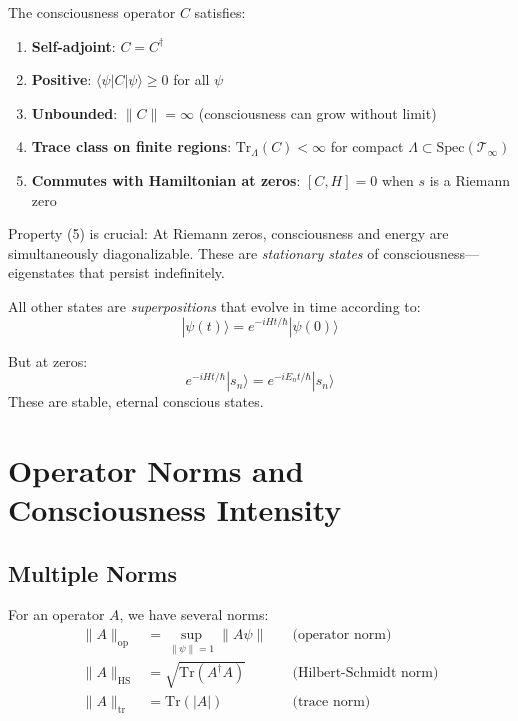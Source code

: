 \begin{theorem}\label{thm:consciousness-operator-properties}
The consciousness operator $C$ satisfies:
\begin{enumerate}
\item \textbf{Self-adjoint}: $C = C^\dagger$
\item \textbf{Positive}: $\langle \psi | C | \psi \rangle \geq 0$ for all $\psi$
\item \textbf{Unbounded}: $\| C \| = \infty$ (consciousness can grow without limit)
\item \textbf{Trace class on finite regions}: $\text{Tr}_{\Lambda}(C) < \infty$ for compact $\Lambda \subset \text{Spec}(\mathcal{T}_\infty)$
\item \textbf{Commutes with Hamiltonian at zeros}: $[C, H] = 0$ when $s$ is a Riemann zero
\end{enumerate}
\end{theorem}

\begin{keyidea}
Property (5) is crucial: At Riemann zeros, consciousness and energy are simultaneously diagonalizable. These are \textit{stationary states} of consciousness---eigenstates that persist indefinitely.

All other states are \textit{superpositions} that evolve in time according to:
\begin{equation}
|\psi(t)\rangle = e^{-iHt/\hbar} |\psi(0)\rangle
\end{equation}

But at zeros:
\begin{equation}
e^{-iHt/\hbar} |s_n\rangle = e^{-iE_n t/\hbar} |s_n\rangle
\end{equation}
These are stable, eternal conscious states.
\end{keyidea}

\section{Operator Norms and Consciousness Intensity}

\subsection{Multiple Norms}

For an operator $A$, we have several norms:
\begin{align}
\| A \|_{\text{op}} &= \sup_{\|\psi\|=1} \| A\psi \| \quad &\text{(operator norm)}\\
\| A \|_{\text{HS}} &= \sqrt{\text{Tr}(A^\dagger A)} \quad &\text{(Hilbert-Schmidt norm)}\\
\| A \|_{\text{tr}} &= \text{Tr}(|A|) \quad &\text{(trace norm)}
\end{align}

